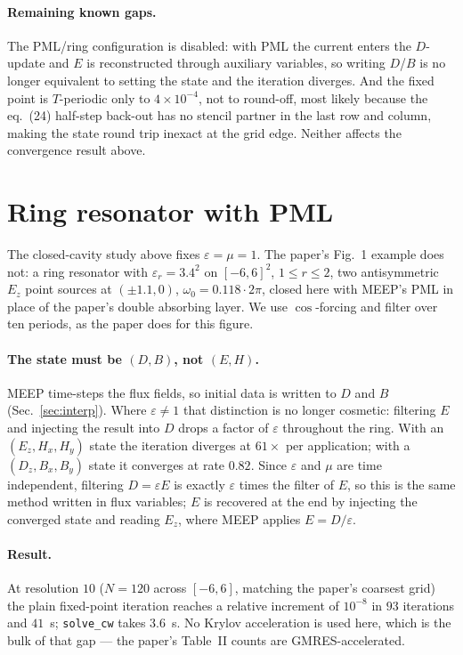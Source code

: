 \documentclass[11pt]{article}
\begin{document}
\paragraph{Remaining known gaps.}
The PML/ring configuration is disabled: with PML the current enters the
$D$-update and $E$ is reconstructed through auxiliary variables, so writing
$D$/$B$ is no longer equivalent to setting the state and the iteration diverges.
And the fixed point is $T$-periodic only to $4\times10^{-4}$, not to round-off,
most likely because the eq.~(24) half-step back-out has no stencil partner in the
last row and column, making the state round trip inexact at the grid edge.
Neither affects the convergence result above.

\section{Ring resonator with PML}

The closed-cavity study above fixes $\varepsilon=\mu=1$. The paper's Fig.~1
example does not: a ring resonator with $\varepsilon_r = 3.4^2$ on
$[-6,6]^2$, $1 \le r \le 2$, two antisymmetric $E_z$ point sources at
$(\pm1.1,0)$, $\omega_0 = 0.118\cdot2\pi$, closed here with MEEP's PML in place
of the paper's double absorbing layer. We use $\cos$-forcing and filter over
ten periods, as the paper does for this figure.

\paragraph{The state must be $(D,B)$, not $(E,H)$.}
MEEP time-steps the flux fields, so initial data is written to $D$ and $B$
(Sec.~\ref{sec:interp}). Where $\varepsilon \ne 1$ that distinction is no
longer cosmetic: filtering $E$ and injecting the result into $D$ drops a factor
of $\varepsilon$ throughout the ring. With an $(E_z,H_x,H_y)$ state the
iteration diverges at $61\times$ per application; with a $(D_z,B_x,B_y)$ state
it converges at rate $0.82$. Since $\varepsilon$ and $\mu$ are time
independent, filtering $D = \varepsilon E$ is exactly $\varepsilon$ times the
filter of $E$, so this is the same method written in flux variables; $E$ is
recovered at the end by injecting the converged state and reading $E_z$, where
MEEP applies $E = D/\varepsilon$.

\paragraph{Result.}
At resolution $10$ ($N=120$ across $[-6,6]$, matching the paper's coarsest
grid) the plain fixed-point iteration reaches a relative increment of
$10^{-8}$ in $93$ iterations and $41$~s; \texttt{solve\_cw} takes $3.6$~s.
No Krylov acceleration is used here, which is the bulk of that gap --- the
paper's Table~II counts are GMRES-accelerated.
\end{document}
